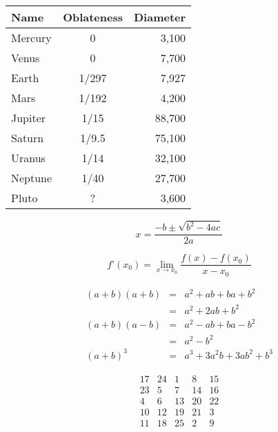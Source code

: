 \documentclass{article}
\begin{document}
\begin{center}
\begin{tabular}{|l|c|r|} %
\hline %
Name & Oblateness & Diameter \\
\hline
Mercury & 0 & 3,100 \\
\hline
Venus & 0 & 7,700 \\
\hline
Earth & 1/297 & 7,927 \\
\hline
Mars & 1/192 & 4,200 \\
\hline
Jupiter & 1/15 & 88,700 \\
\hline
Saturn & 1/9.5 & 75,100 \\
\hline
Uranus & 1/14 & 32,100 \\
\hline
Neptune & 1/40 & 27,700 \\
\hline
Pluto & ? & 3,600\\
\hline
\end{tabular}
\end{center}







\[ x = \frac{-b \pm \sqrt{b^2 - 4ac}}{2a} \]



\begin{equation}
f’(x_0) =
\lim_{x \rightarrow x_0}
\frac{f(x) - f(x_0)}{x - x_0}
\end{equation}




\begin{eqnarray}
(a + b)(a + b) & = & a^2 + ab + ba + b^2 \nonumber \\
& = & a^2 + 2ab + b^2 \label{eq:simp1} \\
(a + b)(a - b) & = & a^2 - ab + ba - b^2 \nonumber \\
& = & a^2 - b^2 \label{eq:simp2} \\
(a + b)^3 & = & a^3 + 3a^2b + 3ab^2 + b^3 \label{eq:simp3}
\end{eqnarray}



\[
\begin{array}{ccccc}
17& 24& 1& 8& 15\\
23& 5& 7& 14& 16\\
4& 6& 13& 20& 22\\
10& 12& 19& 21& 3\\
11& 18& 25& 2& 9
\end{array}
\]
\end{document}
